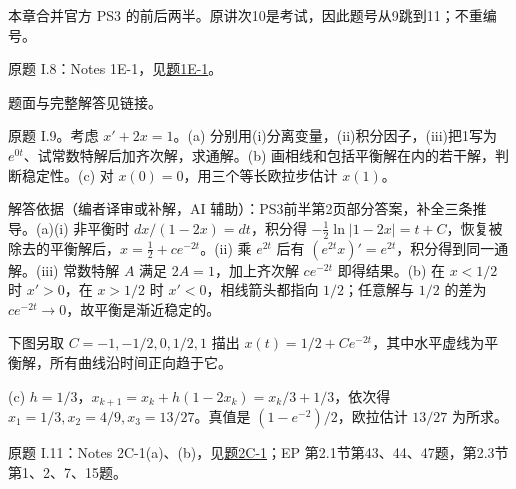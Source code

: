 \label{cw:ps3}
本章合并官方 PS3 的前后两半。原讲次10是考试，因此题号从9跳到11；不重编号。
\begin{exercise}\label{cw:ps3-I-8}原题 I.8：Notes 1E-1，见\hyperref[cw:bank-1E-1]{题1E-1}。\end{exercise}
\begin{solution}题面与完整解答见链接。\end{solution}
\begin{exercise}\label{cw:ps3-I-9}
原题 I.9。考虑 $x'+2x=1$。(a) 分别用(i)分离变量，(ii)积分因子，(iii)把1写为 $e^{0t}$、试常数特解后加齐次解，求通解。(b) 画相线和包括平衡解在内的若干解，判断稳定性。(c) 对 $x(0)=0$，用三个等长欧拉步估计 $x(1)$。
\end{exercise}
\begin{solution}
解答依据（编者译审或补解，AI 辅助）：PS3前半第2页部分答案，补全三条推导。(a)(i) 非平衡时 $dx/(1-2x)=dt$，积分得 $-\frac12\ln|1-2x|=t+C$，恢复被除去的平衡解后，$x=\frac12+ce^{-2t}$。(ii) 乘 $e^{2t}$ 后有 $(e^{2t}x)'=e^{2t}$，积分得到同一通解。(iii) 常数特解 $A$ 满足 $2A=1$，加上齐次解 $ce^{-2t}$ 即得结果。(b) 在 $x<1/2$ 时 $x'>0$，在 $x>1/2$ 时 $x'<0$，相线箭头都指向 $1/2$；任意解与 $1/2$ 的差为 $ce^{-2t}\to0$，故平衡是渐近稳定的。
\begin{center}\end{center}
下图另取 $C=-1,-1/2,0,1/2,1$ 描出 $x(t)=1/2+Ce^{-2t}$，其中水平虚线为平衡解，所有曲线沿时间正向趋于它。
\begin{center}\end{center}
(c) $h=1/3$，$x_{k+1}=x_k+h(1-2x_k)=x_k/3+1/3$，依次得 $x_1=1/3,x_2=4/9,x_3=13/27$。真值是 $(1-e^{-2})/2$，欧拉估计 $13/27$ 为所求。
\end{solution}
\begin{exercise}\label{cw:ps3-I-11}原题 I.11：Notes 2C-1(a)、(b)，见\hyperref[cw:bank-2C-1]{题2C-1}；EP 第2.1节第43、44、47题，第2.3节第1、2、7、15题。\end{exercise}
